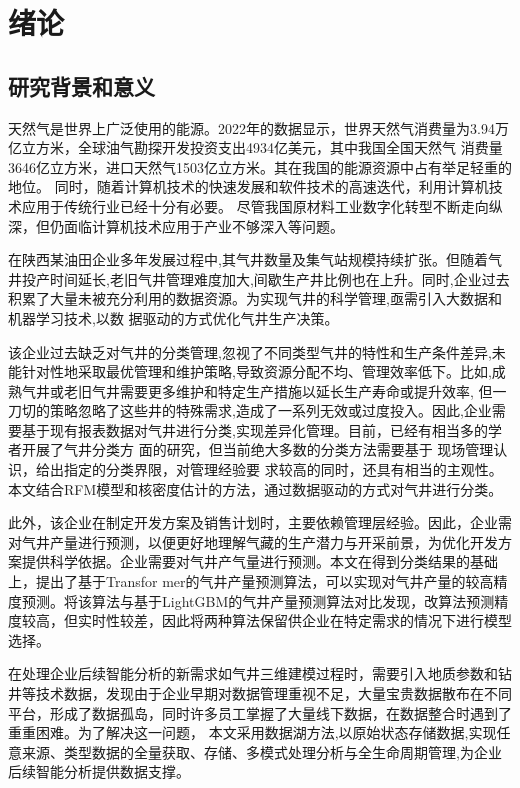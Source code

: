 \chapter{绪论}
\section{研究背景和意义}
天然气是世界上广泛使用的能源。2022年的数据显示，世界天然气消费量为3.94万亿立方米，全球油气勘探开发投资支出4934亿美元，其中我国全国天然气
消费量3646亿立方米，进口天然气1503亿立方米\cite{chinaGasGOv}。其在我国的能源资源中占有举足轻重的地位。
同时，随着计算机技术的快速发展和软件技术的高速迭代，利用计算机技术应用于传统行业已经十分有必要。
尽管我国原材料工业数字化转型不断走向纵深，但仍面临计算机技术应用于产业不够深入等问题\cite{workplanForPetrochemical}。

在陕西某油田企业多年发展过程中,其气井数量及集气站规模持续扩张。但随着气井投产时间延长,老旧气井管理难度加大,间歇生产井比例也在上升。同时,企业过去积累了大量未被充分利用的数据资源。为实现气井的科学管理,亟需引入大数据和机器学习技术,以数
据驱动的方式优化气井生产决策。

该企业过去缺乏对气井的分类管理,忽视了不同类型气井的特性和生产条件差异,未能针对性地采取最优管理和维护策略,导致资源分配不均、管理效率低下。比如,成熟气井或老旧气井需要更多维护和特定生产措施以延长生产寿命或提升效率,
但一刀切的策略忽略了这些井的特殊需求,造成了一系列无效或过度投入。因此,企业需要基于现有报表数据对气井进行分类,实现差异化管理。目前，已经有相当多的学者开展了气井分类方
面的研究，但当前绝大多数的分类方法需要基于
现场管理认识，给出指定的分类界限，对管理经验要
求较高的同时，还具有相当的主观性\cite{SYZC202104015}。本文结合RFM模型\cite{birant2011data}和核密度估计\cite{chen2017tutorial}的方法，通过数据驱动的方式对气井进行分类。

此外，该企业在制定开发方案及销售计划时，主要依赖管理层经验。因此，企业需对气井产量进行预测，以便更好地理解气藏的生产潜力与开采前景，为优化开发方案提供科学依据。企业需要对气井产气量进行预测。本文在得到分类结果的基础上，提出了基于Transfor
mer的气井产量预测算法，可以实现对气井产量的较高精度预测。将该算法与基于LightGBM的气井产量预测算法对比发现，改算法预测精度较高，但实时性较差，因此将两种算法保留供企业在特定需求的情况下进行模型选择。

在处理企业后续智能分析的新需求如气井三维建模过程时，需要引入地质参数和钻井等技术数据，发现由于企业早期对数据管理重视不足，大量宝贵数据散布在不同平台，形成了数据孤岛，同时许多员工掌握了大量线下数据，在数据整合时遇到了重重困难。为了解决这一问题，
本文采用数据湖方法,以原始状态存储数据,实现任意来源、类型数据的全量获取、存储、多模式处理分析与全生命周期管理,为企业后续智能分析提供数据支撑。

